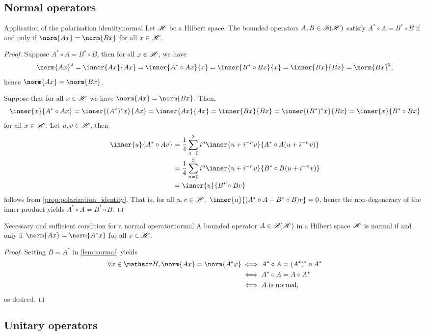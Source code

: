 \subsection{Normal operators}
\begin{lemma}{Application of the polarization identity}{normal}
    Let \(\mathscr{H}\) be a Hilbert space. The bounded operators \(A, B \in \mathscr{B}(\mathscr{H})\) satisfy \(A^* \circ A = B^*\circ B\) if and only if \(\norm{Ax} = \norm{Bx}\) for all \(x \in \mathscr{H}\).
\end{lemma}
\begin{proof}
    Suppose \(A^* \circ A = B^* \circ B\), then for all \(x \in \mathscr{H}\), we have
    \begin{equation*}
        \norm{Ax}^2 = \inner{Ax}{Ax} = \inner{A^*\circ Ax}{x} = \inner{B^*\circ Bx}{x} = \inner{Bx}{Bx} = \norm{Bx}^2,
    \end{equation*}
    hence \(\norm{Ax} = \norm{Bx}\).

    Suppose that for all \(x \in \mathscr{H}\) we have \(\norm{Ax} = \norm{Bx}\). Then,
    \begin{equation*}
        \inner{x}{A^* \circ Ax} = \inner{(A^*)^*x}{Ax} = \inner{Ax}{Ax} = \inner{Bx}{Bx} = \inner{(B^*)^*x}{Bx} = \inner{x}{B^* \circ Bx}
    \end{equation*}
    for all \(x \in \mathscr{H}\). Let \(u, v \in \mathscr{H}\), then
    \begin{align*}
        \inner{u}{A^* \circ A v} &= \frac14\sum_{n=0}^3 i^n\inner{u + i^{-n}v}{A^*\circ A(u + i^{-n}v)}\\
                                 &= \frac14 \sum_{n=0}^3 i^n\inner{u + i^{-n}v}{B^* \circ B(u + i^{-n}v)}\\
                                 &= \inner{u}{B^* \circ B v}
    \end{align*}
    follows from \cref{prop:polarization_identity}. That is, for all \(u, v \in \mathscr{H}\), \(\inner{u}{(A^*\circ A - B^*\circ B)v} = 0\), hence the non-degeneracy of the inner product yields \(A^*\circ A = B^*\circ B\).
\end{proof}

\begin{proposition}{Necessary and sufficient condition for a normal operator}{normal}
    A bounded operator \(A \in \mathscr{B}(\mathscr{H})\) in a Hilbert space \(\mathscr{H}\) is normal if and only if \(\norm{Ax} = \norm{A^* x}\) for all \(x \in \mathscr{H}\).
\end{proposition}
\begin{proof}
    Setting \(B = A^*\) in \cref{lem:normal} yields
    \begin{align*}
        \forall x \in \hilbert, \norm{Ax} = \norm{A^*x} &\iff A^*\circ A = (A^*)^*\circ A^*\\
                                                        &\iff A^* \circ A = A \circ A^*\\
                                                        &\iff A\text{ is normal,}
    \end{align*}
    as desired.
\end{proof}

\subsection{Unitary operators}
\todo
